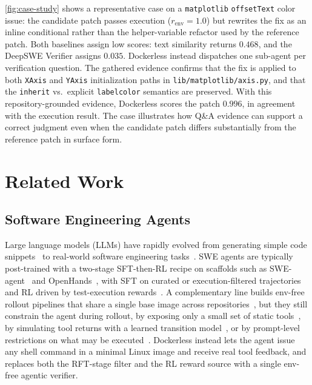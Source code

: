\documentclass{llmxive}
\providecommand{\approach}{Dockerless\xspace}
\begin{document}
\cref{fig:case-study} shows a representative case on a \texttt{matplotlib} \texttt{offsetText} color issue: the candidate patch passes execution ($r_{\text{env}}{=}1.0$) but rewrites the fix as an inline conditional rather than the helper-variable refactor used by the reference patch.
Both baselines assign low scores: text similarity returns $0.468$, and the DeepSWE Verifier assigns $0.035$.
\approach instead dispatches one sub-agent per verification question. The gathered evidence confirms that the fix is applied to both \texttt{XAxis} and \texttt{YAxis} initialization paths in \texttt{lib/matplotlib/axis.py}, and that the \texttt{inherit} vs.\ explicit \texttt{labelcolor} semantics are preserved.
With this repository-grounded evidence, \approach scores the patch $0.996$, in agreement with the execution result. 
The case illustrates how Q\&A evidence can support a correct judgment even when the candidate patch differs substantially from the reference patch in surface form.



\section{Related Work}
\label{sec:related}

\subsection{Software Engineering Agents}
Large language models (LLMs) have rapidly evolved from generating simple code snippets~\cite{PengGGHL24,abs-2501-01329,GaoWGWZL23,shi2024code} to real-world software engineering tasks~\cite{jimenez2024swe,yang2024swe,li2025swe,chen2025swe}. SWE agents are typically post-trained with a two-stage SFT-then-RL recipe on scaffolds such as SWE-agent~\citep{yang2024swe} and OpenHands~\citep{wang2025openhands}, with SFT on curated or execution-filtered trajectories~\citep{pan2025training, jain2025r2e, yang2025swe, badertdinov2026swe, yang2025kimi} and RL driven by test-execution rewards~\citep{wei2025swerl, luo2025deepswe, golubev2025training, shao2024deepseekmath, yu2025dapo}.
A complementary line builds env-free rollout pipelines that share a single base image across repositories~\citep{sun2026swe,xu2025scalable,ludwig2026swe}, but they still constrain the agent during rollout, by exposing only a small set of static tools~\citep{xu2025scalable}, by simulating tool returns with a learned transition model~\citep{sun2026swe}, or by prompt-level restrictions on what may be executed~\citep{ludwig2026swe}.
\approach instead lets the agent issue any shell command in a minimal Linux image and receive real tool feedback, and replaces both the RFT-stage filter and the RL reward source with a single env-free agentic verifier.
\end{document}
